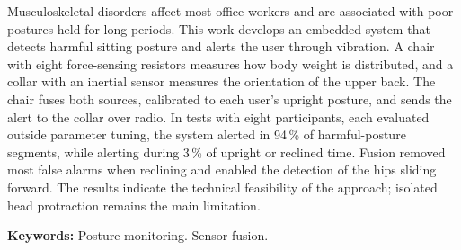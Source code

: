Musculoskeletal disorders affect most office workers and are associated with poor postures held for long periods. This work develops an embedded system that detects harmful sitting posture and alerts the user through vibration. A chair with eight force-sensing resistors measures how body weight is distributed, and a collar with an inertial sensor measures the orientation of the upper back. The chair fuses both sources, calibrated to each user's upright posture, and sends the alert to the collar over radio. In tests with eight participants, each evaluated outside parameter tuning, the system alerted in 94\,\% of harmful-posture segments, while alerting during 3\,\% of upright or reclined time. Fusion removed most false alarms when reclining and enabled the detection of the hips sliding forward. The results indicate the technical feasibility of the approach; isolated head protraction remains the main limitation.

\vspace{0.2cm}

\textbf{Keywords:} Posture monitoring. Sensor fusion.


